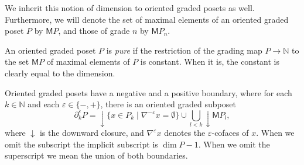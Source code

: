\documentclass[12pt,a4paper]{article}
\numberwithin{equation}{section}
\begin{document}
\begin{remark}
    We inherit this notion of dimension to oriented graded posets as well. Furthermore, we will denote the set of maximal elements of an oriented graded poset $P$ by $\mathsf{M}P$, and those of grade $n$ by $\mathsf{M}P_n$.
\end{remark}

\begin{definition}
    An oriented graded poset $P$ is \emph{pure} if the restriction of the grading map $P \to \mathbb{N}$ to the set $\mathsf{M}P$ of maximal elements of $P$ is constant. When it is, the constant is clearly equal to the dimension.
\end{definition}


\begin{definition}\label{def:boundary}
    Oriented graded posets have a negative and a positive boundary, where for each $k \in \mathbb{N}$ and each $\varepsilon \in \{ -,+ \}$, there is an oriented graded subposet
    \begin{equation}
        \partial^\varepsilon_k P = \downarrow\! \{ x \in P_k \mid \nabla^{-\varepsilon}x = \emptyset \} \cup \bigcup_{l < k} \downarrow\! \mathsf{M}P_l,
    \end{equation}
    where $\downarrow$ is the downward closure, and $\nabla^\varepsilon x$ denotes the $\varepsilon$-cofaces of $x$. When we omit the subscript the implicit subscript is $\dim P - 1$. When we omit the superscript we mean the union of both boundaries.
\end{definition}
\end{document}
